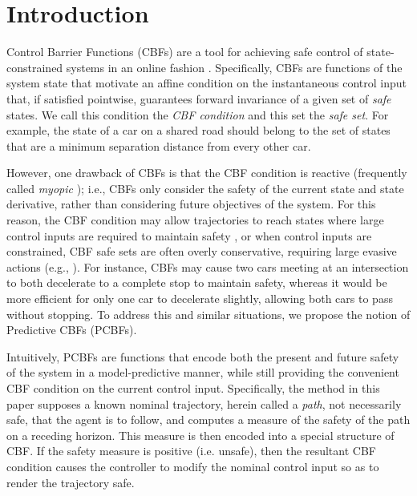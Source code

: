 \documentclass[10pt,conference]{ieeeconf}
\renewcommand{\(}{\left(}
\renewcommand{\)}{\right)}
\renewcommand{\[}{\left[}
\renewcommand{\]}{\right]}
\begin{document}
\vspace{-3pt}
\section{Introduction}

{Control Barrier Functions (CBFs) are a tool for achieving safe control of state-constrained systems in an online fashion \cite{CBF_Tutorial}.}
Specifically, CBFs are functions of the system state that motivate an affine condition on the instantaneous control input that, if satisfied pointwise, guarantees forward invariance of a given set of \textit{safe} states. We call this condition the \textit{CBF condition} and this set the \textit{safe set}. For example, {the state of a car on a shared road should belong to the set of states that are a minimum separation distance from every other car.}

However, one drawback of CBFs is that the CBF condition is reactive (frequently called \emph{myopic} \cite{approximate_optimal_control}); i.e., CBFs only consider the safety of the current state and state derivative, rather than considering future objectives of the system. %
For this reason, the CBF condition may allow trajectories to reach states where large control inputs are required to maintain safety \cite{approximate_optimal_control,multilayer_icra}, or when control inputs are constrained, CBF safe sets are often overly conservative, requiring large evasive actions (e.g., \cite{Automatica}). For instance, CBFs may cause two cars meeting at an intersection to both decelerate to a complete stop to maintain {safety}, whereas it would be more efficient for only one car to decelerate slightly, allowing both cars to {pass} without stopping. To address this and similar situations, we propose the notion of Predictive CBFs (PCBFs). 

Intuitively, PCBFs are functions that encode both the present and future safety of the system in a model-predictive manner, while still providing the convenient CBF condition on the current control input. Specifically, the method in this paper supposes a known nominal trajectory, herein called a \emph{path}, not necessarily safe, that the agent is to follow, and {computes} a measure of the safety of the path on a receding horizon. {This measure is then encoded into a special structure of CBF}. If the {safety} measure is positive {(i.e. unsafe)}, then the resultant CBF condition causes the controller to modify the nominal control input {so as} to render the trajectory safe.
\end{document}
